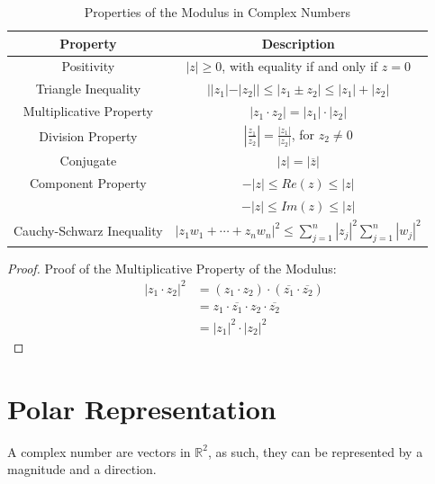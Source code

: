 \begin{table}[htbp]
    \centering
    \caption{Properties of the Modulus in Complex Numbers}
    \begin{tabular}{|c|c|}
        \hline
        \textbf{Property}         & \textbf{Description}                                                           \\
        \hline
        Positivity                & $|z| \geq 0$, with equality if and only if $z = 0$                             \\
        \hline
        Triangle Inequality       & $||z_1| - |z_2|| \leq |z_1 \pm z_2| \leq |z_1| + |z_2|$                        \\
        \hline
        Multiplicative Property   & $|z_1 \cdot z_2| = |z_1| \cdot |z_2|$                                          \\
        \hline
        Division Property         & $\left|\frac{z_1}{z_2}\right| = \frac{|z_1|}{|z_2|}$, for $z_2 \neq 0$         \\
        \hline
        Conjugate                 & $|z| = |\overline{z}|$                                                         \\
        \hline
        Component Property        & $-|z| \leq Re(z) \leq |z|$                                                     \\ & $-|z| \leq Im(z) \leq |z|$ \\
        \hline
        Cauchy-Schwarz Inequality & $|z_1w_1 + \cdots + z_nw_n|^2 \leq \sum_{j=1}^{n}|z_j|^2\sum_{j=1}^{n}|w_j|^2$ \\
        \hline
    \end{tabular}
\end{table}

\begin{proof}
    Proof of the Multiplicative Property of the Modulus:
    \begin{align*}
        |z_1 \cdot z_2|^2 & = (z_1 \cdot z_2) \cdot (\overline{z_1} \cdot \overline{z_2}) \\
                          & = z_1 \cdot \overline{z_1} \cdot z_2 \cdot \overline{z_2}     \\
                          & = |z_1|^2 \cdot |z_2|^2
    \end{align*}
\end{proof}
\section{Polar Representation}
A complex number are vectors in $\mathbb{R}^2$, as such, they can be represented by a magnitude and a direction. \\

